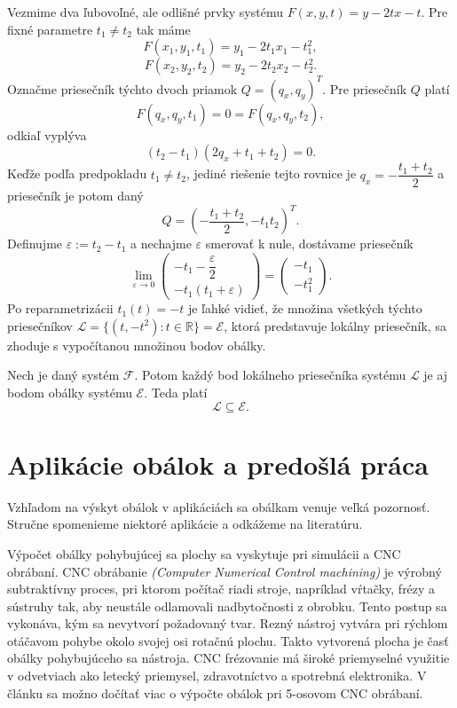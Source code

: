 \begin{example}
Vezmime dva ľubovoľné, ale odlišné prvky systému $F(x, y, t) = y - 2tx - t.$
Pre fixné parametre $t_1 \neq t_2$ tak máme
$$F(x_1, y_1, t_1) = y_1 - 2t_1x_1 - t_1^2,$$
$$F(x_2, y_2, t_2) = y_2 - 2t_2x_2 - t_2^2.$$ 
Označme priesečník týchto dvoch priamok $Q = (q_x, q_y)^T.$ Pre priesečník $Q$ platí $$F(q_x, q_y, t_1) = 0 = F(q_x, q_y, t_2),$$ odkiaľ vyplýva 
$$(t_2 - t_1)(2q_x + t_1 + t_2) = 0.$$ 
Keďže podľa predpokladu $t_1 \neq t_2$, jediné riešenie tejto rovnice je $q_x = -\dfrac{t_1 + t_2}{2}$ a priesečník je potom daný 
$$Q = (-\dfrac{t_1 + t_2}{2}, -t_1t_2)^T.$$ Definujme $\varepsilon := t_2 - t_1$ a nechajme $\varepsilon$ smerovať k nule, dostávame priesečník
$$
\lim_{\varepsilon \to 0} 
\begin{pmatrix} 
-t_1 - \dfrac{\varepsilon}{2} \\
-t_1(t_1 + \varepsilon)
\end{pmatrix} = \begin{pmatrix} 
-t_1 \\
-t_1^2
\end{pmatrix}.
$$
Po reparametrizácii $t_1(t) = -t$ je ľahké vidieť, že množina všetkých týchto priesečníkov $\mathcal{L} = \{(t, -t^2): t \in \mathbb{R}\} = \mathcal{E}$, ktorá predstavuje lokálny priesečník, sa zhoduje s vypočítanou množinou bodov obálky.
\end{example}

\begin{corollary} Nech je daný systém $\mathcal{F}$. Potom každý bod lokálneho priesečníka systému $\mathcal{L}$ je aj bodom obálky systému $\mathcal{E}$. Teda platí
$$ \mathcal{L} \subseteq \mathcal{E}. $$
\end{corollary}

\section{Aplikácie obálok a predošlá práca}
Vzhľadom na výskyt obálok v aplikáciách sa obálkam venuje veľká pozornosť. Stručne spomenieme niektoré aplikácie a odkážeme na literatúru. 

Výpočet obálky pohybujúcej sa plochy sa vyskytuje pri simulácii a CNC obrábaní. CNC obrábanie \textit{(Computer Numerical Control machining)}  je výrobný subtraktívny proces, pri ktorom počítač riadi stroje, napríklad vŕtačky, frézy a sústruhy tak, aby neustále odlamovali nadbytočnosti z obrobku. Tento postup sa vykonáva, kým sa nevytvorí požadovaný tvar. Rezný nástroj vytvára pri rýchlom otáčavom pohybe okolo svojej osi rotačnú plochu. Takto vytvorená plocha je časť obálky pohybujúceho sa nástroja. CNC frézovanie má široké priemyselné využitie v odvetviach ako letecký priemysel, zdravotníctvo a spotrebná elektronika. V článku \cite{Skop20} sa možno dočítať viac o výpočte obálok pri 5-osovom CNC obrábaní.  

